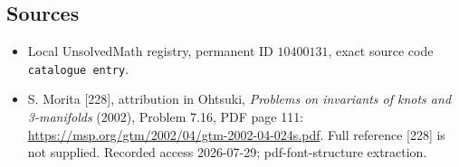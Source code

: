 \documentclass[11pt]{article}
\begin{document}
\subsection{Sources}
\begin{itemize}
\item Local UnsolvedMath registry, permanent ID \(10400131\), exact source code \texttt{catalogue entry}.
\item S. Morita [228], attribution in Ohtsuki, \emph{Problems on invariants of knots and 3-manifolds} (2002), Problem 7.16, PDF page 111: \url{https://msp.org/gtm/2002/04/gtm-2002-04-024s.pdf}. Full reference [228] is not supplied. Recorded access 2026-07-29; pdf-font-structure extraction.
\end{itemize}
\end{document}

